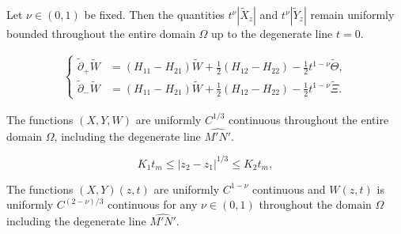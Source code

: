 \documentclass[10pt,a4paper]{amsart}
\begin{document}
\begin{lemma}\label{Sol_3_l3}
    Let $\nu\in(0,1)$ be fixed. Then the quantities $t^{\nu}|\widetilde  {X}_{z}|$ and $t^{\nu}| \widetilde Y_{z}|$ remain uniformly bounded throughout the entire domain $\Omega$ up to the degenerate line $t=0$.
\end{lemma}

    \begin{equation}\label{Sol4_24}
      \begin{split}
          \begin{cases}
               \tilde \partial_+ \widetilde W&=(H_{11}-H_{21})\widetilde W+\frac{1}{2}(H_{12}-H_{22})-\frac{1}{2}t^{1-\nu}\widetilde \Theta,\\
               \tilde \partial_- \widetilde W&=(H_{11}-H_{21})\widetilde W+\frac{1}{2}(H_{12}-H_{22})-\frac{1}{2}t^{1-\nu}\widetilde \Xi.
          \end{cases}
      \end{split}
    \end{equation}

\begin{lemma}\label{Sol_3_l5}
    The functions $( X, Y,W)$ are uniformly $C^{1/3}$ continuous throughout the entire domain $\Omega$, including the degenerate line $\widehat{M'N'}$.
\end{lemma}

    \begin{equation}\label{Sol4_27}
        K_1t_m\leq |z_2-z_1|^{1/3}\leq K_2t_m,
    \end{equation}

\begin{lemma}\label{Sol_3_l6}
    The functions $( X, Y)(z,t)$ are uniformly $C^{1-\nu}$ continuous and $W(z,t)$ is uniformly $C^{(2-\nu)/3}$ continuous for any $\nu\in(0,1)$ throughout the domain $\Omega$ including the degenerate line $\widehat{M'N'}$.
\end{lemma}
\end{document}
